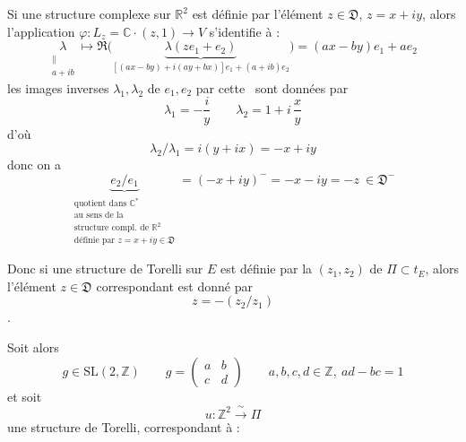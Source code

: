 \documentclass[11pt,a4paper]{article}
\begin{document}
Si une structure complexe sur $\mathbb{R}^2$ est définie par l'élément $z \in \mathfrak{D}$,
$z = x + iy$, alors l'application 
$\varphi : L_z = \mathbb{C}\cdot(z, 1) \longrightarrow V$ s'identifie à :
\[
  \underset{\substack{\| \\ a + ib}}{\lambda} \longmapsto
  \Re\bigl(\underbrace{\lambda(z e_1 + e_2)}_{[(ax - by) + i(ay + bx)] e_1 + (a + ib) e_2}\bigr)
  = (ax - by) e_1 + a e_2
\]
les images inverses $\lambda_1, \lambda_2$ de $e_1, e_2$ par cette \ sont données par
\[
  \lambda_1 = -\frac{i}{y} \qquad \lambda_2 = 1 + i\,\frac{x}{y}
\]
d'où
\[
  \lambda_2 / \lambda_1 = i(y + ix) = -x + iy
\]
donc on a
\[
  \underset{\substack{\text{quotient dans } \mathbb{C}^* \\ \text{au sens de la} \\
  \text{structure compl.\ de } \mathbb{R}^2 \\ \text{définie par } z = x + iy \in \mathfrak{D}}}
  {\underbrace{e_2 / e_1}}
  = (-x + iy)^{-} = -x - iy = -z \ \in \mathfrak{D}^{-}
\]

Donc si une structure de Torelli sur $E$ est définie par la 
 $(z_1, z_2)$ de $\Pi \subset t_E$, alors l'élément $z \in \mathfrak{D}$ correspondant est
donné par
\[
  z = -(z_2 / z_1) \tag{24}
\]
.

Soit alors
\[
  g \in \mathrm{SL}(2, \mathbb{Z}) \qquad g = \begin{pmatrix} a & b \\ c & d \end{pmatrix}
  \qquad a, b, c, d \in \mathbb{Z},\ ad - bc = 1
\]
et soit \struck{\ill{}}
\[
  u : \mathbb{Z}^2 \xrightarrow{\;\sim\;} \Pi
\]
une structure de Torelli, correspondant à :
\end{document}
